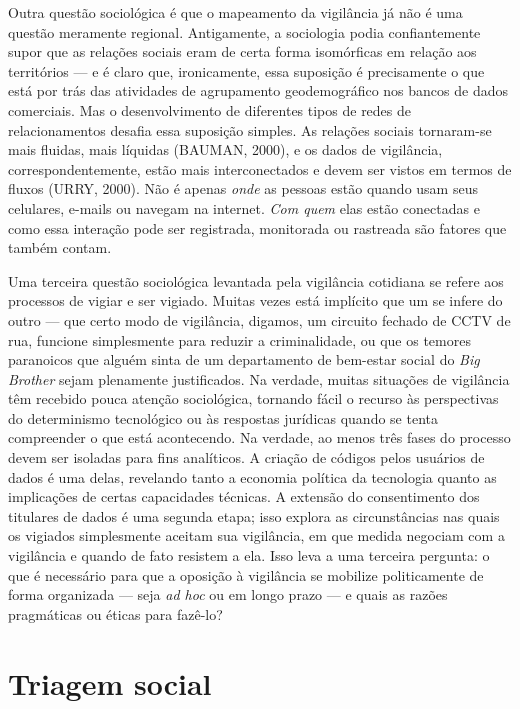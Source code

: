Outra questão sociológica é que o mapeamento da vigilância já não é uma
questão meramente regional. Antigamente, a sociologia podia
confiantemente supor que as relações sociais eram de certa forma
isomórficas em relação aos territórios --- e é claro que, ironicamente,
essa suposição é precisamente o que está por trás das atividades de
agrupamento geodemográfico nos bancos de dados comerciais. Mas o
desenvolvimento de diferentes tipos de redes de relacionamentos desafia
essa suposição simples. As relações sociais tornaram-se mais fluidas,
mais líquidas (BAUMAN, 2000), e os dados de vigilância,
correspondentemente, estão mais interconectados e devem ser vistos em
termos de fluxos (URRY, 2000). Não é apenas \emph{onde} as pessoas estão
quando usam seus celulares, e-mails ou navegam na internet. \emph{Com
quem} elas estão conectadas e como essa interação pode ser registrada,
monitorada ou rastreada são fatores que também contam.

Uma terceira questão sociológica levantada pela vigilância cotidiana se
refere aos processos de vigiar e ser vigiado. Muitas vezes está
implícito que um se infere do outro --- que certo modo de vigilância,
digamos, um circuito fechado de CCTV de rua, funcione simplesmente para
reduzir a criminalidade, ou que os temores paranoicos que alguém sinta
de um departamento de bem-estar social do \emph{Big Brother} sejam
plenamente justificados. Na verdade, muitas situações de vigilância têm
recebido pouca atenção sociológica, tornando fácil o recurso às
perspectivas do determinismo tecnológico ou às respostas jurídicas
quando se tenta compreender o que está acontecendo. Na verdade, ao menos
três fases do processo devem ser isoladas para fins analíticos. A
criação de códigos pelos usuários de dados é uma delas, revelando tanto
a economia política da tecnologia quanto as implicações de certas
capacidades técnicas. A extensão do consentimento dos titulares de dados
é uma segunda etapa; isso explora as circunstâncias nas quais os
vigiados simplesmente aceitam sua vigilância, em que medida negociam com
a vigilância e quando de fato resistem a ela. Isso leva a uma terceira
pergunta: o que é necessário para que a oposição à vigilância se
mobilize politicamente de forma organizada --- seja \emph{ad hoc} ou em
longo prazo --- e quais as razões pragmáticas ou éticas para fazê-lo?

\section{Triagem social}

